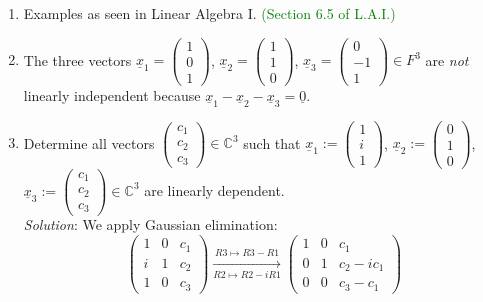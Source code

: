 \documentclass[
  12pt,
  a4paper,
  twoside]{article}
\theoremstyle{plain}
\theoremstyle{definition}
\begin{document}
\begin{enumerate}
\def\labelenumi{(\alph{enumi})}
\item
  Examples as seen in Linear Algebra I. \textcolor{green}{(Section 6.5 of L.A.I.)}
\item
  The three vectors \(\underline{x}_1 = \begin{pmatrix} 1 \\ 0 \\ 1 \end{pmatrix}\),
  \(\underline{x}_2 = \begin{pmatrix} 1 \\ 1 \\ 0 \end{pmatrix}\),
  \(\underline{x}_3 = \begin{pmatrix} 0 \\ -1 \\ 1 \end{pmatrix} \in F^3\)
  are \emph{not} linearly independent because \(\underline{x}_1 - \underline{x}_2 - \underline{x}_3 = \underline{0}\).
\item
  Determine all vectors \(\begin{pmatrix} c_1 \\ c_2 \\ c_3 \end{pmatrix} \in \mathbb{C}^3\)
  such that \(\underline{x}_1:= \begin{pmatrix} 1 \\ i \\ 1 \end{pmatrix}\),
  \(\underline{x}_2:= \begin{pmatrix} 0 \\ 1 \\ 0 \end{pmatrix}\),
  \(\underline{x}_3:= \begin{pmatrix} c_1 \\ c_2 \\ c_3 \end{pmatrix} \in \mathbb{C}^3\) are linearly dependent.\\
  \emph{Solution}: We apply Gaussian elimination:
  \[\begin{pmatrix} 1 & 0 & c_1 \\ i & 1 & c_2 \\ 1 & 0 & c_3 \end{pmatrix}
  \xrightarrow[R2 \mapsto R2 - iR1]{R3 \mapsto R3 - R1}
  \begin{pmatrix} 1 & 0 & c_1 \\ 0 & 1 & c_2 - ic_1 \\ 0 & 0 & c_3 - c_1 \end{pmatrix}\]\\

\end{enumerate}
\end{document}

